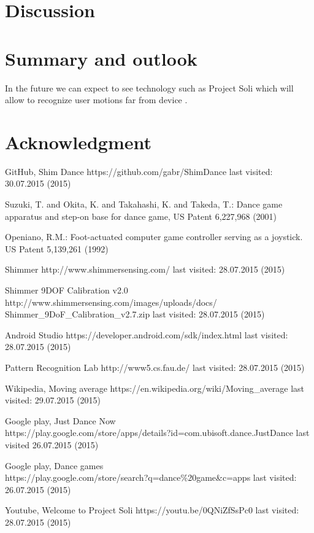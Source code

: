 \documentclass[conference]{IEEEtran}
\begin{document}
\section{Discussion}
 
\section{Summary and outlook}
In the future we can expect to see technology such as Project Soli which will allow to recognize user motions far from device \cite{ProjectSoli}.




\section*{Acknowledgment}


\begin{thebibliography}{5}

GitHub, Shim Dance {https://github.com/gabr/ShimDance} last visited: 30.07.2015 (2015)

Suzuki, T. and Okita, K. and Takahashi, K. and Takeda, T.: {Dance game apparatus and step-on base for dance game}, US Patent 6,227,968 (2001)

Openiano, R.M.: {Foot-actuated computer game controller serving as a joystick}. US Patent 5,139,261 (1992)

Shimmer {http://www.shimmersensing.com/} last visited: 28.07.2015 (2015)

Shimmer 9DOF Calibration v2.0\\{http://www.shimmersensing.com/images/uploads/docs/\\Shimmer\_9DoF\_Calibration\_v2.7.zip} last visited: 28.07.2015 (2015)

Android Studio {https://developer.android.com/sdk/index.html} last visited: 28.07.2015 (2015)

Pattern Recognition Lab {http://www5.cs.fau.de/} last visited: 28.07.2015 (2015)

Wikipedia, Moving average {https://en.wikipedia.org/wiki/Moving\_average} last visited: 29.07.2015 (2015)

Google play, Just Dance Now\\{https://play.google.com/store/apps/details?id=com.ubisoft.dance.JustDance} last visited 26.07.2015 (2015)

Google play, Dance games\\{https://play.google.com/store/search?q=dance\%20game\&c=apps} last visited: 26.07.2015 (2015)

Youtube, Welcome to Project Soli {https://youtu.be/0QNiZfSsPc0} last visited: 28.07.2015 (2015)

\end{thebibliography}

\end{document}
